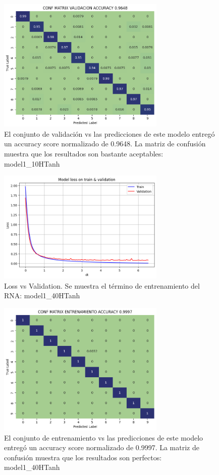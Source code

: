 \documentclass[journal]{IEEEtai}
\begin{document}
\begin{figure}[H]
\centering
\includegraphics[width=8cm]{img/model10HTanh/val.png}
\caption{El conjunto de validación vs las predicciones de este modelo entregó un accuracy score normalizado de  0.9648. La matriz de confusión muestra que los resultados son bastante aceptables: model1\_10HTanh}
\label{fig: model110HTanhVAL}
\end{figure}

\begin{figure}[H]
\centering
\includegraphics[width=8cm]{img/model40HTanh/lossvsval.png}
\caption{Loss vs Validation. Se muestra el término de entrenamiento del RNA: model1\_40HTanh}
\label{fig: model140HTanhLOSSVSVAL}
\end{figure}

\begin{figure}[H]
\centering
\includegraphics[width=8cm]{img/model40HTanh/train.png}
\caption{El conjunto de entrenamiento vs las predicciones de este modelo entregó un accuracy score normalizado de  0.9997. La matriz de confusión muestra que los resultados son perfectos: model1\_40HTanh}
\label{fig: model140HTanhTRAIN}
\end{figure}
\end{document}
